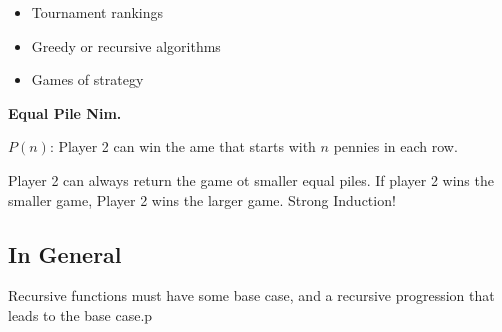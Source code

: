 \documentclass{article}
\begin{document}
\begin{itemize}
    \item Tournament rankings \\
    \item Greedy or recursive algorithms \\
    \item Games of strategy
\end{itemize}

\noindent\textbf{Equal Pile Nim.}

\begin{centering}
$P(n)$: Player 2 can win the ame that starts with $n$ pennies in each row.
\end{centering}

Player 2 can always return the game ot smaller equal piles. If player 2 wins the smaller game, Player 2 wins the larger game. Strong Induction!

\subsection*{In General}

Recursive functions must have some base case, and a recursive progression that leads to the base case.p
\end{document}
